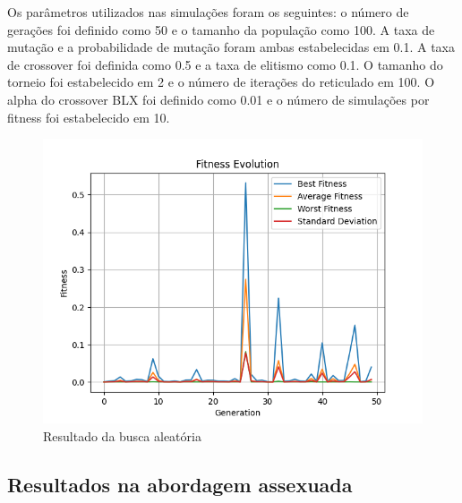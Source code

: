 \documentclass[12pt]{article}
\begin{document}
Os parâmetros utilizados nas simulações foram os seguintes: o número de gerações foi definido como 50 e o tamanho da população como 100. A taxa de mutação e a probabilidade de mutação foram ambas estabelecidas em 0.1. A taxa de crossover foi definida como 0.5 e a taxa de elitismo como 0.1. O tamanho do torneio foi estabelecido em 2 e o número de iterações do reticulado em 100. O alpha do crossover BLX foi definido como 0.01 e o número de simulações por fitness foi estabelecido em 10.

\begin{figure}[h]
    \centering
    \includegraphics[width=0.5\linewidth]{figures/random_search.png}
    \caption{Resultado da busca aleatória}
    \label{fig:random-search}
\end{figure}

\subsection{Resultados na abordagem assexuada}
\end{document}

